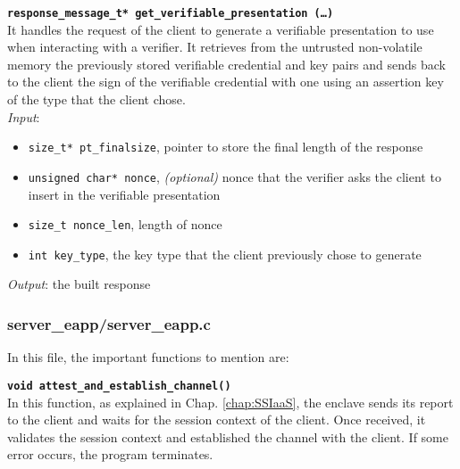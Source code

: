 \noindent
\texttt{\bfseries response\_message\_t* get\_verifiable\_presentation (\dots)}\\
It handles the request of the client to generate a verifiable presentation to use when interacting with a verifier. It retrieves from the untrusted non-volatile memory the previously stored verifiable credential and key pairs and sends back to the client the sign of the verifiable credential with one using an assertion key of the type that the client chose. \\
\textit{Input}:
\begin{itemize}[noitemsep,nolistsep]
  \item \texttt{size\_t* pt\_finalsize}, pointer to store the final length of the response
  \item \texttt{unsigned char* nonce}, \textit{(optional)} nonce that the verifier asks the client to insert in the verifiable presentation  
  \item \texttt{size\_t nonce\_len}, length of nonce
  \item \texttt{int key\_type}, the key type that the client previously chose to generate 
\end{itemize}
\textit{Output}: the built response 

\newpage
\subsubsection{server\_eapp/server\_eapp.c}
In this file, the important functions to mention are:

\noindent
\texttt{\bfseries void attest\_and\_establish\_channel()}\\
In this function, as explained in Chap. \ref{chap:SSIaaS}, the enclave sends its report to the client and waits for the session context of the client. Once received, it validates the session context and established the channel with the client. If some error occurs, the program terminates. \\


